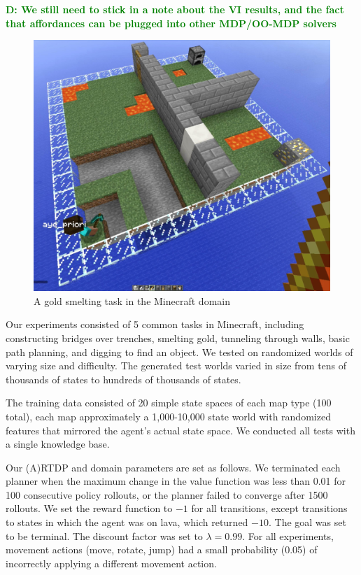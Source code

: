 \documentclass[conference]{IEEEtran}
\newcommand{\dnote}[1]{\textcolor{Green}{\textbf{D: #1}}}
\begin{document}
\dnote{We still need to stick in a note about the VI results, and the fact that affordances can be plugged into
other MDP/OO-MDP solvers}

\begin{figure}[t]
\centering
\includegraphics[scale=0.13]{figures/epicworld_1.jpg}%
  \caption{A gold smelting task in the Minecraft domain}
  \label{fig:minecraft}
\end{figure}

Our experiments consisted of 5 common tasks in Minecraft, including
constructing bridges over trenches, smelting gold, tunneling
through walls, basic path planning, and digging to find an object.  We tested on 
randomized worlds of varying size and difficulty. The generated test
worlds varied in size from tens of thousands of states to hundreds of thousands of states.

The training data consisted of 20 simple state spaces of each map type
(100 total), each map approximately a 1,000-10,000 state world with
randomized features that mirrored the agent's actual state space. We conducted all tests
with a single knowledge base.

Our (A)RTDP and domain parameters are set as follows. We terminated each planner
when the maximum change in the value function was less than 0.01 for
100 consecutive policy rollouts, or the planner failed to converge
after 1500 rollouts.  We set the reward function to $-1$ for all
transitions, except transitions to states in which the agent was on
lava, which returned $-10$. The goal was set to be terminal. The
discount factor was set to $\lambda = 0.99$. For all experiments,
movement actions (move, rotate, jump) had a small probability (0.05)
of incorrectly applying a different movement action.
\end{document}
